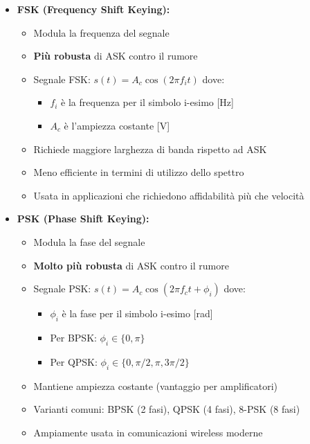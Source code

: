 \begin{itemize}
\begin{itemize}
        \item \textbf{FSK (Frequency Shift Keying):}
            \begin{itemize}
                \item Modula la frequenza del segnale
                \item \textbf{Più robusta} di ASK contro il rumore
                \item Segnale FSK: $s(t) = A_c \cos(2\pi f_i t)$ dove:
                    \begin{itemize}
                        \item $f_i$ è la frequenza per il simbolo i-esimo [\si{Hz}]
                        \item $A_c$ è l'ampiezza costante [\si{V}]
                    \end{itemize}
                \item Richiede maggiore larghezza di banda rispetto ad ASK
                \item Meno efficiente in termini di utilizzo dello spettro
                \item Usata in applicazioni che richiedono affidabilità più che velocità
            \end{itemize}
        
        \item \textbf{PSK (Phase Shift Keying):}
            \begin{itemize}
                \item Modula la fase del segnale
                \item \textbf{Molto più robusta} di ASK contro il rumore
                \item Segnale PSK: $s(t) = A_c \cos(2\pi f_c t + \phi_i)$ dove:
                    \begin{itemize}
                        \item $\phi_i$ è la fase per il simbolo i-esimo [\si{rad}]
                        \item Per BPSK: $\phi_i \in \{0, \pi\}$
                        \item Per QPSK: $\phi_i \in \{0, \pi/2, \pi, 3\pi/2\}$
                    \end{itemize}
                \item Mantiene ampiezza costante (vantaggio per amplificatori)
                \item Varianti comuni: BPSK (2 fasi), QPSK (4 fasi), 8-PSK (8 fasi)
                \item Ampiamente usata in comunicazioni wireless moderne
            \end{itemize}
        

\end{itemize}
\end{itemize}
